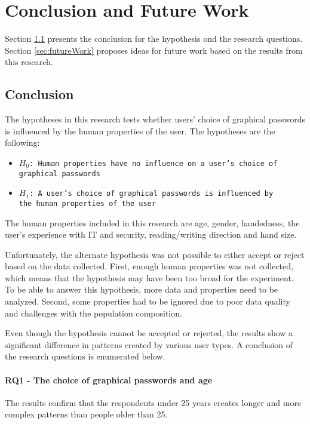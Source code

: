 \chapter{Conclusion and Future Work}\label{chap:conclusion}
  

  Section \ref{sec:conclusion} presents the conclusion for the hypothesis ond the research questions. Section \ref{sec:futureWork} proposes ideas for future work based on the results from this research. 

  \clearpage
  \section{Conclusion}\label{sec:conclusion}
    

The hypotheses in this research tests whether users' choice of graphical passwords is influenced by the human properties of the user. The hypotheses are the following:

    {\renewcommand\labelitemi{}
          \begin{itemize}
            \item \texttt{$H_{0}$: Human properties have no influence on a user's choice of \\graphical passwords}
            \item \texttt{$H_{1}$: A user's choice of graphical passwords is influenced by \\the human properties of the user}
          \end{itemize}
        }

The human properties included in this research are age, gender, handedness, the user's experience with IT and security, reading/writing direction and hand size. 

Unfortunately, the alternate hypothesis was not possible to either accept or reject based on the data collected. First, enough human properties was not collected, which means that the hypothesis may have been too broad for the experiment. To be able to answer this hypothesis, more data and properties need to be analyzed. Second, some properties had to be ignored due to poor data quality and challenges with the population composition. 

Even though the hypothesis cannot be accepted or rejected, the results show a significant difference in patterns created by various user types. A conclusion of the research questions is enumerated below. 

\subsubsection*{RQ1 - The choice of graphical passwords and age}
The results confirm that the respondents under 25 years creates longer and more complex patterns than people older than 25.

